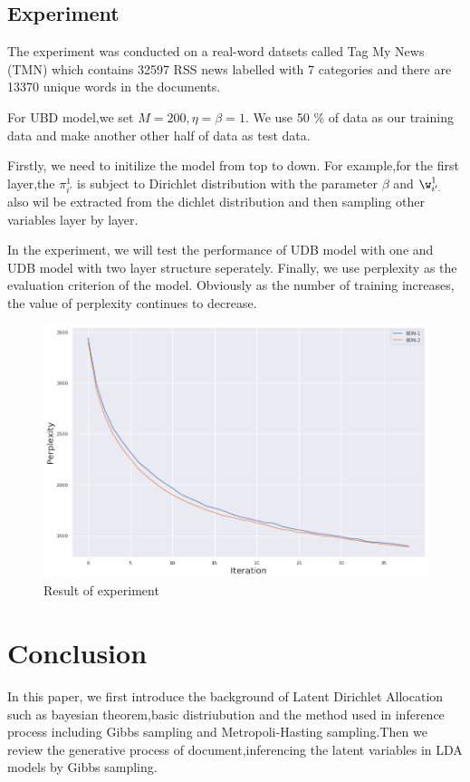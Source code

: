 \section {Experiment}

The experiment was conducted on a real-word datsets called Tag My News (TMN) \cite{data} which contains 32597 RSS news labelled with 7 categories and there are 13370 unique words in the documents.

For UBD model,we set $M = 200,\eta = \beta = 1$. We use 50 \% of data as our training data and make another other half of data as test data.

Firstly, we need to initilize the model from top to down. For example,for the first layer,the $\pi_{i'}^1$ is subject to Dirichlet distribution with the parameter $\beta$ and $\w_{i'.}^1$ also wil be extracted from the dichlet distribution and then sampling other variables layer by layer.

In the experiment, we will test the performance of UDB model with one and UDB model with two layer structure seperately. Finally,
we use perplexity as the evaluation criterion of the model. Obviously as the number of training increases, the value of perplexity continues to decrease.

\begin{figure}[b]
\includegraphics[width = \linewidth]{res.png}
\caption{Result of experiment}
\label{fig:DirBN Model}
\end{figure}


\chapter{Conclusion}\label{ccl}
In this paper, we first introduce the background of Latent Dirichlet Allocation such as bayesian theorem,basic distriubution and the method used in inference process including Gibbs sampling and Metropoli-Hasting sampling.Then we review the generative process of document,inferencing the latent variables in LDA models by Gibbs sampling.

